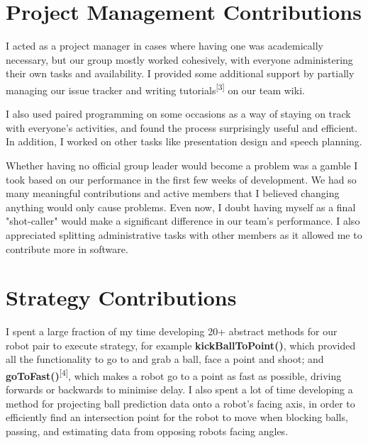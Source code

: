 \documentclass[a4paper,11pt]{article}
\begin{document}

\section{Project Management Contributions}

I acted as a project manager in cases where having one was academically necessary, but our group mostly worked cohesively, with everyone administering their own tasks and availability. I provided some additional support by partially managing our issue tracker and writing tutorials\textsuperscript{[3]} on our team wiki.

I also used paired programming on some occasions as a way of staying on track with everyone's activities, and found the process surprisingly useful and efficient. In addition, I worked on other tasks like presentation design and speech planning.

Whether having no official group leader would become a problem was a gamble I took based on our performance in the first few weeks of development. We had so many meaningful contributions and active members that I believed changing anything would only cause problems. Even now, I doubt having myself as a final "shot-caller" would make a significant difference in our team's performance. I also appreciated splitting administrative tasks with other members as it allowed me to contribute more in software. 


\section{Strategy Contributions}

I spent a large fraction of my time developing 20+ abstract methods for our robot pair to execute strategy, for example \textbf{kickBallToPoint()}, which provided all the functionality to go to and grab a ball, face a point and shoot; and \textbf{goToFast()}\textsuperscript{[4]}, which makes a robot go to a point as fast as possible, driving forwards or backwards to minimise delay. I also spent a lot of time developing a method for projecting ball prediction data onto a robot's facing axis, in order to efficiently find an intersection point for the robot to move when blocking balls, passing, and estimating data from opposing robots facing angles.
\end{document}
